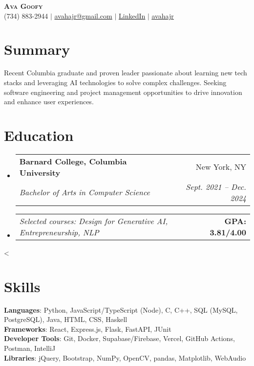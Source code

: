 \documentclass[letterpaper,11pt]{article}
\makeatletter
\newcommand{\resumeSubheading}[4]{
    \vspace{-2pt}\item
    \begin{tabular*}{0.97\textwidth}[t]{l@{\extracolsep{\fill}}r}
    \textbf{#1} & #2 \\
    \textit{\small#3} & \textit{\small #4} \\
    \end{tabular*}\vspace{-7pt}
}
\newcommand{\relevantCourseWorkAndGPA}[2]{
    \item
    \begin{tabular*}{0.97\textwidth}{l@{\extracolsep{\fill}}r}
    \textit{Selected courses: \small#1} & \textbf{\small GPA: #2/4.00} \\
    \end{tabular*}\vspace{-7pt}
}
\newcommand{\conditionalVspace}[1]{%
\ifnum\value{enumi}<\value{enumii}%
\vspace{#1}%
\fi
}
\newcommand{\resumeSubHeadingListStart}{\begin{itemize}[leftmargin=0.15in, label={}] \setlength{\itemsep}{7pt}}
\newcommand{\resumeSubHeadingListEnd}{\end{itemize}\conditionalVspace{7pt}}
\makeatother
\begin{document}

\begin{center}
\textbf{\Huge \scshape Ava Goofy} \\ \vspace{1pt}
\small (734) 883-2944 $|$ \href{mailto:avahajr@gmail.com}{{avahajr@gmail.com}} $|$
\href{https://linkedin.com/in/avahajr}{\color{blue} \underline{LinkedIn}} $|$
{\faGithub} \href{https://github.com/avahajr}{\color{blue}\underline{avahajr}}
\end{center}

\section{Summary}
\small Recent Columbia graduate and proven leader passionate about learning new tech stacks and leveraging AI technologies to solve complex challenges. Seeking software engineering and project management opportunities to drive innovation and enhance user experiences.
\section{Education}
\resumeSubHeadingListStart
\resumeSubheading
{Barnard College, Columbia University}{New York, NY}
{Bachelor of Arts in Computer Science}{Sept. 2021 -- Dec. 2024}
\relevantCourseWorkAndGPA{Design for Generative AI, Entrepreneurship, NLP}{3.81}
\resumeSubHeadingListEnd

\section{Skills}
\begin{itemize}[leftmargin=0.15in, label={}]
\small{\item{
\textbf{Languages}{: Python, JavaScript/TypeScript (Node), C, C++, SQL (MySQL, PostgreSQL), Java, HTML, CSS, Haskell} \\
\textbf{Frameworks}{: React, Express.js, Flask, FastAPI, JUnit } \\
\textbf{Developer Tools}{: Git, Docker, Supabase/Firebase, Vercel, GitHub Actions, Postman, IntelliJ} \\
\textbf{Libraries}{: jQuery, Bootstrap, NumPy, OpenCV, pandas, Matplotlib, WebAudio}
}}
\end{itemize}
\end{document}

